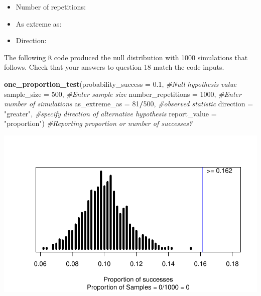 \documentclass[
]{report}
\newenvironment{Shaded}{\begin{snugshade}}{\end{snugshade}}
\newcommand{\CommentTok}[1]{\textcolor[rgb]{0.56,0.35,0.01}{\textit{#1}}}
\newcommand{\DataTypeTok}[1]{\textcolor[rgb]{0.13,0.29,0.53}{#1}}
\newcommand{\DecValTok}[1]{\textcolor[rgb]{0.00,0.00,0.81}{#1}}
\newcommand{\FloatTok}[1]{\textcolor[rgb]{0.00,0.00,0.81}{#1}}
\newcommand{\KeywordTok}[1]{\textcolor[rgb]{0.13,0.29,0.53}{\textbf{#1}}}
\newcommand{\NormalTok}[1]{#1}
\newcommand{\OperatorTok}[1]{\textcolor[rgb]{0.81,0.36,0.00}{\textbf{#1}}}
\newcommand{\StringTok}[1]{\textcolor[rgb]{0.31,0.60,0.02}{#1}}
\providecommand{\tightlist}{%
  \setlength{\itemsep}{0pt}\setlength{\parskip}{0pt}}
\begin{document}
\vspace{.2in}

\begin{itemize}
\tightlist
\item
  Number of repetitions:
\end{itemize}

\vspace{.2in}

\begin{itemize}
\tightlist
\item
  As extreme as:
\end{itemize}

\vspace{.2in}

\begin{itemize}
\tightlist
\item
  Direction:
\end{itemize}

\newpage

The following \texttt{R} code produced the null distribution with 1000 simulations that follows. Check that your answers to question 18 match the code inputs.

\begin{Shaded}
\begin{Highlighting}[]
\KeywordTok{one\_proportion\_test}\NormalTok{(}\DataTypeTok{probability\_success =} \FloatTok{0.1}\NormalTok{, }\CommentTok{\#Null hypothesis value}
                    \DataTypeTok{sample\_size =} \DecValTok{500}\NormalTok{, }\CommentTok{\#Enter sample size}
                    \DataTypeTok{number\_repetitions =} \DecValTok{1000}\NormalTok{, }\CommentTok{\#Enter number of simulations}
                    \DataTypeTok{as\_extreme\_as =} \DecValTok{81}\OperatorTok{/}\DecValTok{500}\NormalTok{, }\CommentTok{\#observed statistic}
                    \DataTypeTok{direction =} \StringTok{"greater"}\NormalTok{, }\CommentTok{\#specify direction of alternative hypothesis}
                    \DataTypeTok{report\_value =} \StringTok{"proportion"}\NormalTok{) }\CommentTok{\#Reporting proportion or number of successes?}
\end{Highlighting}
\end{Shaded}

\begin{center}\includegraphics[width=0.7\linewidth]{06-inference-1cat_files/figure-latex/unnamed-chunk-4-1} \end{center}
\end{document}
